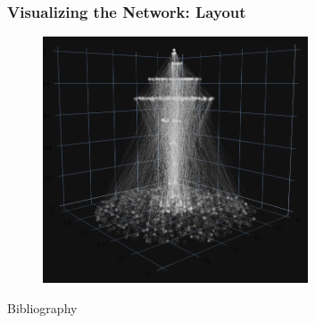 \documentclass[fleqn]{beamer}
\begin{document}
    \begin{frame}
        \frametitle{Visualizing the Network: Layout}
        \begin{figure}[htpb]
            \centering
            \includegraphics[width=0.7\textwidth]{./pics/plot_sin2.png}
        \end{figure}
    \end{frame}

    \begin{frame}{Bibliography}
        \nocite{barabasi}
        \nocite{pypi}
        \printbibliography
    \end{frame}
\end{document}
